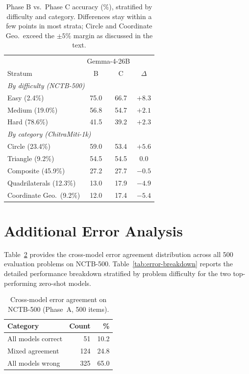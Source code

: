 \documentclass[11pt]{article}
\begin{document}
\begin{table}[t]
\centering\small
\begin{tabular}{lccc}
\toprule
& \multicolumn{2}{c}{Gemma-4-26B} & \\
Stratum & B & C & $\Delta$ \\
\midrule
\multicolumn{4}{l}{\textit{By difficulty (NCTB-500)}} \\
Easy (2.4\%) & 75.0 & 66.7 & $+8.3$ \\
Medium (19.0\%) & 56.8 & 54.7 & $+2.1$ \\
Hard (78.6\%) & 41.5 & 39.2 & $+2.3$ \\
\multicolumn{4}{l}{\textit{By category (ChitraMiti-1k)}} \\
Circle (23.4\%) & 59.0 & 53.4 & $+5.6$ \\
Triangle (9.2\%) & 54.5 & 54.5 & $0.0$ \\
Composite (45.9\%) & 27.2 & 27.7 & $-0.5$ \\
Quadrilaterals (12.3\%) & 13.0 & 17.9 & $-4.9$ \\
Coordinate Geo.\ (9.2\%) & 12.0 & 17.4 & $-5.4$ \\
\bottomrule
\end{tabular}
\caption{Phase B vs.\ Phase C accuracy (\%), stratified by difficulty and category. Differences stay within a few points in most strata; Circle and Coordinate Geo.\ exceed the $\pm5$\% margin as discussed in the text.}
\label{tab:stratified}
\end{table}

\section{Additional Error Analysis}
\label{app:error_analysis}

Table~\ref{tab:error-overlap} provides the cross-model error agreement distribution across all 500 evaluation problems on NCTB-500. Table~\ref{tab:error-breakdown} reports the detailed performance breakdown stratified by problem difficulty for the two top-performing zero-shot models.

\begin{table}[ht]
\centering
\caption{Cross-model error agreement on NCTB-500 (Phase~A, 500 items).}
\label{tab:error-overlap}
\small
\begin{tabular}{lrr}
\toprule
\textbf{Category} & \textbf{Count} & \textbf{\%} \\
\midrule
All models correct & \phantom{0}51 & 10.2 \\
Mixed agreement    & 124 & 24.8 \\
All models wrong   & 325 & 65.0 \\
\bottomrule
\end{tabular}
\end{table}
\end{document}
